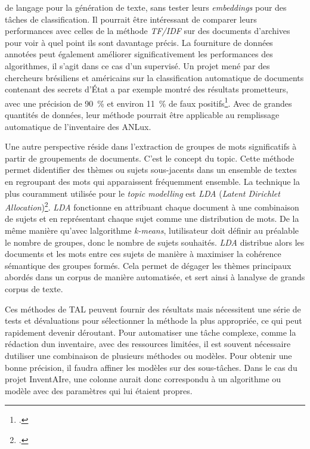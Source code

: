 de langage pour la génération de texte, sans tester leurs
\emph{embeddings} pour des tâches de classification. Il pourrait être
intéressant de comparer leurs performances avec celles de la méthode
\emph{TF/IDF} sur des documents d'archives pour voir à quel point ils
sont davantage précis. La fourniture de données annotées peut
également améliorer significativement les performances des algorithmes,
il s'agit dans ce cas d'un \gls{supervisé}. Un projet mené par
des chercheurs brésiliens et américains sur la classification
automatique de documents contenant des secrets d'État a par exemple
montré des résultats prometteurs, avec une précision de 90~\% et environ
11~\% de faux positifs\footcite{souza_using_2016}.
Avec de grandes quantités de données, leur méthode pourrait être
applicable au remplissage automatique de l'inventaire des ANLux.
\newline

Une autre perspective réside dans l'extraction de groupes de mots
significatifs à partir de groupements de documents. C'est le concept du
\gls{topic}. Cette méthode permet
d\textquotesingle identifier des thèmes ou sujets sous-jacents dans un
ensemble de textes en regroupant des mots qui apparaissent fréquemment
ensemble. La technique la plus couramment utilisée pour le \emph{topic
	modelling} est \emph{LDA} (\emph{Latent Dirichlet
	Allocation})\footcite{velonis_topic_2022}. 
	\emph{LDA} fonctionne en attribuant chaque document à une
combinaison de sujets et en représentant chaque sujet comme une
distribution de mots. De la même manière qu'avec
l\textquotesingle algorithme \emph{k-means},
l\textquotesingle utilisateur doit définir au préalable le nombre de
groupes, donc le nombre de sujets souhaités. \emph{LDA} distribue alors
les documents et les mots entre ces sujets de manière à maximiser la
cohérence sémantique des groupes formés. Cela permet de dégager les
thèmes principaux abordés dans un corpus de manière automatisée, et sert
ainsi à l\textquotesingle analyse de grands corpus de texte.

Ces méthodes de TAL peuvent fournir des résultats mais nécessitent une série de tests et d\textquotesingle évaluations
pour sélectionner la méthode la plus appropriée, ce qui peut rapidement
devenir déroutant. Pour automatiser une tâche complexe, comme la
rédaction d\textquotesingle un inventaire, avec des ressources limitées,
il est souvent nécessaire d\textquotesingle utiliser une combinaison de
plusieurs méthodes ou modèles. Pour obtenir une bonne précision, il faudra affiner les modèles sur des sous-tâches. Dans le cas du
projet InventAIre, une colonne aurait donc correspondu à un algorithme ou modèle avec des
paramètres qui lui étaient propres.

